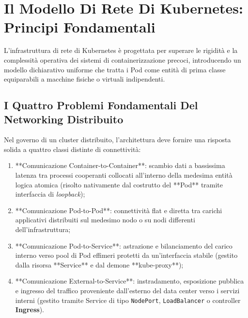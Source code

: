 \documentclass[11pt, a4paper]{article}
\begin{document}
\newpage


\section{Il Modello Di Rete Di Kubernetes: Principi Fondamentali}

L'infrastruttura di rete di Kubernetes è progettata per superare le rigidità e la complessità operativa dei sistemi di containerizzazione precoci, introducendo un modello dichiarativo uniforme che tratta i Pod come entità di prima classe equiparabili a macchine fisiche o virtuali indipendenti.

\subsection{I Quattro Problemi Fondamentali Del Networking Distribuito}

Nel governo di un cluster distribuito, l'architettura deve fornire una risposta solida a quattro classi distinte di connettività:
\begin{enumerate}[noitemsep]
    \item **Comunicazione Container-to-Container**: scambio dati a bassissima latenza tra processi cooperanti collocati all'interno della medesima entità logica atomica (risolto nativamente dal costrutto del **Pod** tramite interfaccia di \emph{loopback});
    \item **Comunicazione Pod-to-Pod**: connettività flat e diretta tra carichi applicativi distribuiti sul medesimo nodo o su nodi differenti dell'infrastruttura;
    \item **Comunicazione Pod-to-Service**: astrazione e bilanciamento del carico interno verso pool di Pod effimeri protetti da un'interfaccia stabile (gestito dalla risorsa **Service** e dal demone **kube-proxy**);
    \item **Comunicazione External-to-Service**: instradamento, esposizione pubblica e ingresso del traffico proveniente dall'esterno del data center verso i servizi interni (gestito tramite Service di tipo \texttt{NodePort}, \texttt{LoadBalancer} o controller \textbf{Ingress}).
\end{enumerate}

\end{document}
